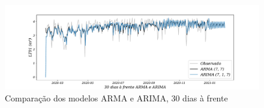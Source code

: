 \begin{figure}[!htpb]
	\centering
	\caption{Comparação dos modelos ARMA e ARIMA, 30 dias à frente }
	\label{fig:60-ARMA-ARIMA24}
	\includegraphics[width=1\linewidth]{Apendices/Figuras/modelagem-24h/30-ARMA-ARIMA}
	
\end{figure}